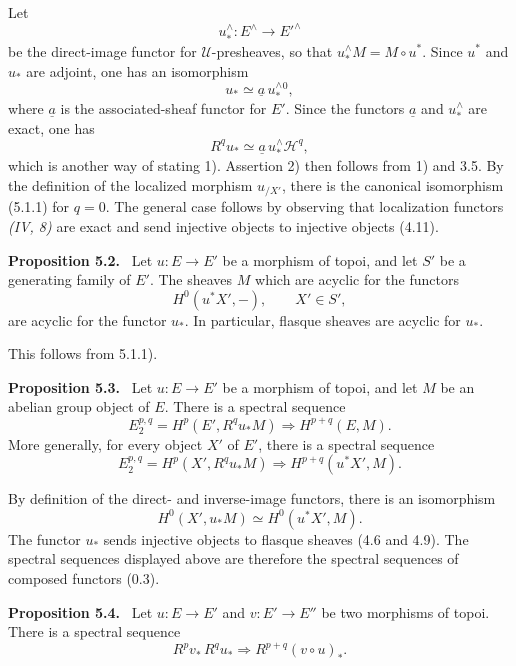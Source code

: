 \documentclass[11pt]{article}
\newcommand{\U}{\mathcal{U}}
\newcommand{\Hh}{\mathcal{H}}
\newenvironment{statement}[1]{\par\medskip\noindent\textbf{#1.}\ }{\par\medskip}
\begin{document}
Let
\[
        u_*^{\wedge}:E^{\wedge}\longrightarrow E'^{\wedge}
\]
be the direct-image functor for $\U$-presheaves, so that $u_*^{\wedge}M=M\circ u^*$. Since $u^*$ and $u_*$ are adjoint, one has an isomorphism
\[
        u_*\simeq \underline a\,u_*^{\wedge}{}^{0},
\]
where $\underline a$ is the associated-sheaf functor for $E'$. Since the functors $\underline a$ and $u_*^{\wedge}$ are exact, one has
\[
        R^q u_*\simeq \underline a\,u_*^{\wedge}\Hh^q,
\]
which is another way of stating 1). Assertion 2) then follows from 1) and 3.5. By the definition of the localized morphism $u_{/X'}$, there is the canonical isomorphism (5.1.1) for $q=0$. The general case follows by observing that localization functors \emph{(IV, 8)} are exact and send injective objects to injective objects (4.11).

\begin{statement}{Proposition 5.2}
Let $u:E\to E'$ be a morphism of topoi, and let $S'$ be a generating family of $E'$. The sheaves $M$ which are acyclic for the functors
\[
        H^0(u^*X',-),\qquad X'\in S',
\]
are acyclic for the functor $u_*$. In particular, flasque sheaves are acyclic for $u_*$.
\end{statement}

This follows from 5.1.1).

\begin{statement}{Proposition 5.3}
Let $u:E\to E'$ be a morphism of topoi, and let $M$ be an abelian group object of $E$. There is a spectral sequence
\begin{equation*}
        E_2^{p,q}=H^p(E',R^q u_*M)\Longrightarrow H^{p+q}(E,M).\tag{5.3.1}
\end{equation*}
More generally, for every object $X'$ of $E'$, there is a spectral sequence
\begin{equation*}
        E_2^{p,q}=H^p(X',R^q u_*M)\Longrightarrow H^{p+q}(u^*X',M).\tag{5.3.2}
\end{equation*}
\end{statement}

By definition of the direct- and inverse-image functors, there is an isomorphism
\[
        H^0(X',u_*M)\simeq H^0(u^*X',M).
\]
The functor $u_*$ sends injective objects to flasque sheaves (4.6 and 4.9). The spectral sequences displayed above are therefore the spectral sequences of composed functors (0.3).

\begin{statement}{Proposition 5.4}
Let $u:E\to E'$ and $v:E'\to E''$ be two morphisms of topoi. There is a spectral sequence
\[
        R^p v_*\,R^q u_*\Longrightarrow R^{p+q}(v\circ u)_* .
\]
\end{statement}
\end{document}
